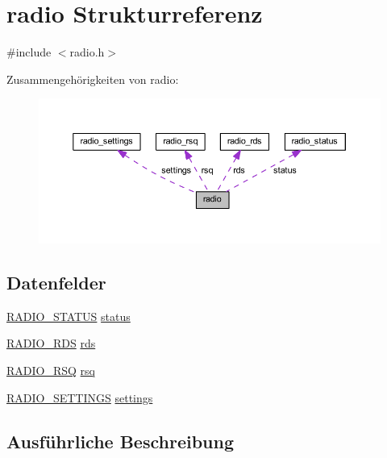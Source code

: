 \hypertarget{structradio}{}\section{radio Strukturreferenz}
\label{structradio}


{\ttfamily \#include $<$radio.\+h$>$}



Zusammengehörigkeiten von radio\+:
\nopagebreak
\begin{figure}[H]
\begin{center}
\leavevmode
\includegraphics[width=350pt]{structradio__coll__graph}
\end{center}
\end{figure}
\subsection*{Datenfelder}
\begin{DoxyCompactItemize}
\item 
\hyperlink{radio_8h_a903525b4070dadc3575c79be7341f94c}{R\+A\+D\+I\+O\+\_\+\+S\+T\+A\+T\+U\+S} \hyperlink{structradio_ac40df2ac7cfc276418e34335098903fb}{status}
\item 
\hyperlink{radio_8h_a45097f726be0f44e9afecd5102888dbd}{R\+A\+D\+I\+O\+\_\+\+R\+D\+S} \hyperlink{structradio_a44efb20f93a5de661983c36b4a870f4e}{rds}
\item 
\hyperlink{radio_8h_ab4334359915ce423f1ca752a4384a70f}{R\+A\+D\+I\+O\+\_\+\+R\+S\+Q} \hyperlink{structradio_aba45ded08c975dcc6ee7d58687e8534e}{rsq}
\item 
\hyperlink{radio_8h_a7ad276cb3b26c8610e25b52c55d8fab6}{R\+A\+D\+I\+O\+\_\+\+S\+E\+T\+T\+I\+N\+G\+S} \hyperlink{structradio_a458724faf4e8216b3d6b8beb9b2894c2}{settings}
\end{DoxyCompactItemize}


\subsection{Ausführliche Beschreibung}


